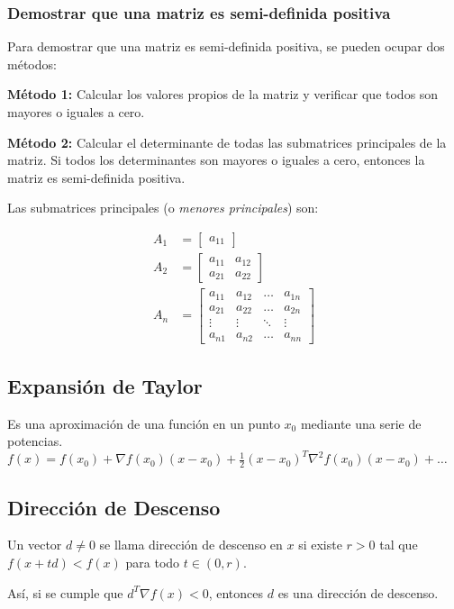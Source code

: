 \documentclass{article}
\begin{document}
\subsubsection*{Demostrar que una matriz es semi-definida positiva}

Para demostrar que una matriz es semi-definida positiva, se pueden ocupar dos métodos:

\textbf{Método 1:} Calcular los valores propios de la matriz y verificar que todos son mayores o iguales a cero.

\vspace{.5cm}

\textbf{Método 2:} Calcular el determinante de todas las submatrices principales de la matriz. Si todos los determinantes son mayores o iguales a cero, entonces la matriz es semi-definida positiva.

Las submatrices principales (o \textit{menores principales}) son:

\begin{align*}
    A_1 & = \begin{bmatrix}
                a_{11}
            \end{bmatrix}                    \\
    A_2 & = \begin{bmatrix}
                a_{11} & a_{12} \\
                a_{21} & a_{22}
            \end{bmatrix}                   \\
    A_n & = \begin{bmatrix}
                a_{11} & a_{12} & \ldots & a_{1n} \\
                a_{21} & a_{22} & \ldots & a_{2n} \\
                \vdots & \vdots & \ddots & \vdots \\
                a_{n1} & a_{n2} & \ldots & a_{nn}
            \end{bmatrix}
\end{align*}



\subsection*{Expansión de Taylor}

Es una aproximación de una función en un punto $x_0$ mediante una serie de potencias. $f(x) = f(x_0) + \nabla f(x_0) (x - x_0) + \frac{1}{2} (x - x_0)^T \nabla^2 f(x_0) (x - x_0) + \ldots$

\subsection*{Dirección de Descenso}

Un vector $d\neq 0$ se llama dirección de descenso en $x$ si existe $r > 0$ tal que $f(x + td) < f(x)$ para todo $t \in (0, r)$.

Así, si se cumple que $d^T\nabla f(x) < 0$, entonces $d$ es una dirección de descenso.
\end{document}
